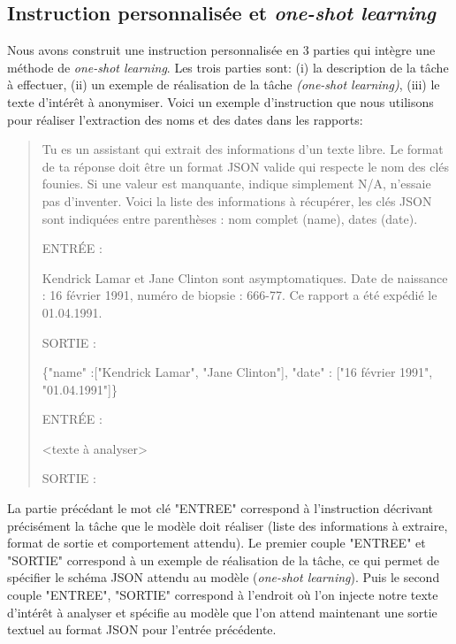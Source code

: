 \subsection{Instruction personnalisée et \textit{one-shot learning}}
Nous avons construit une instruction personnalisée en 3 parties qui intègre une méthode de \textit{one-shot learning}. Les trois parties sont: (i) la description de la tâche à effectuer, (ii) un exemple de réalisation de la tâche \textit{(one-shot learning)}, (iii) le texte d'intérêt à anonymiser.
Voici un exemple d'instruction que nous utilisons pour réaliser l'extraction des noms et des dates dans les rapports:
\begin{quote}
Tu es un assistant qui extrait des informations d'un texte libre. Le format de ta réponse doit être un format JSON valide qui respecte le nom des clés founies. Si une valeur est manquante, indique simplement N/A, n'essaie pas d'inventer. Voici la liste des informations à récupérer, les clés JSON sont indiquées entre parenthèses : nom complet (name), dates (date).

ENTRÉE :

Kendrick Lamar et Jane Clinton sont asymptomatiques. Date de naissance : 16 février 1991, numéro de biopsie : 666-77. Ce rapport a été expédié le 01.04.1991.

SORTIE :

\{"name" :["Kendrick Lamar", "Jane Clinton"], "date" : ["16 février 1991", "01.04.1991"]\}

ENTRÉE :

<texte à analyser>

SORTIE :
\end{quote}

La partie précédant le mot clé "ENTREE" correspond à l'instruction décrivant précisément la tâche que le modèle doit réaliser (liste des informations à extraire, format de sortie et comportement attendu). Le premier couple "ENTREE" et "SORTIE" correspond à un exemple de réalisation de la tâche, ce qui permet de spécifier le schéma JSON attendu au modèle (\textit{one-shot learning}). Puis le second couple "ENTREE", "SORTIE" correspond à l'endroit où l'on injecte notre texte d'intérêt à analyser et spécifie au modèle que l'on attend maintenant une sortie textuel au format JSON pour l'entrée précédente.

